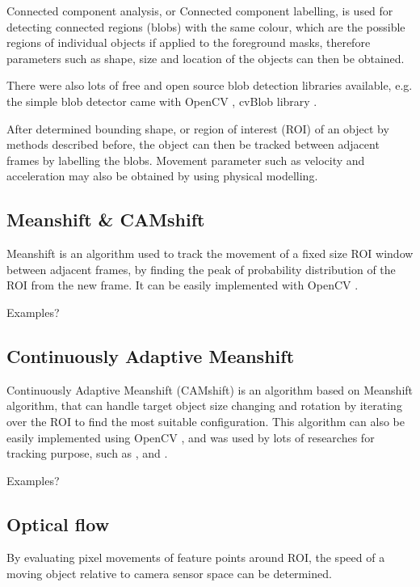 Connected component analysis, or Connected component labelling, is used for detecting connected regions (blobs) with the same colour, which are the possible regions of individual objects if applied to the foreground masks, therefore parameters such as shape, size and location of the objects can then be obtained.

There were also lots of free and open source blob detection libraries available, e.g. the simple blob detector came with OpenCV \cite{opencv:blob}, cvBlob library \cite{cvblob}.

After determined bounding shape, or region of interest (ROI) of an object by methods described before, the object can then be tracked between adjacent frames by labelling the blobs. Movement parameter such as velocity and acceleration may also be obtained by using physical modelling.

\subsection{Meanshift \& CAMshift}

Meanshift \cite{fukunaga2013introduction} is an algorithm used to track the movement of a fixed size ROI window between adjacent frames, by finding the peak of probability distribution of the ROI from the new frame. {\color{red}It can be easily implemented with OpenCV \cite{opencv:camshift}.}

{\color{red}Examples?}

\subsection{Continuously Adaptive Meanshift}

Continuously Adaptive Meanshift (CAMshift) \cite{bradski1998computer} is an algorithm based on Meanshift algorithm, that can handle target object size changing and rotation by iterating over the ROI to find the most suitable configuration. This algorithm can also be easily implemented using OpenCV \cite{opencv:camshift}, and was used by lots of researches for tracking purpose, such as \cite{chu2007object}, \cite{xu2012moving} and \cite{nouar2006improved}.

{\color{red}Examples?}

\subsection {Optical flow}

By evaluating pixel movements of feature points around ROI, the speed of a moving object relative to camera sensor space can be determined.

